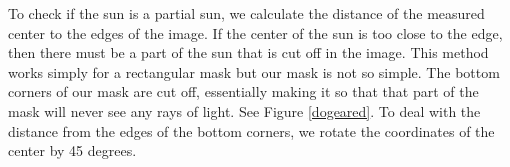 \documentclass[10pt]{scrartcl}
\begin{document}
To check if the sun is a partial sun, we calculate the distance of the measured center to the edges of the image. If the center of the sun is too close to the edge, then there must be a part of the sun that is cut off in the image. This method works simply for a rectangular mask but our mask is not so simple. The bottom corners of our mask are cut off, essentially making it so that that part of the mask will never see any rays of light. See Figure \ref{dogeared}. To deal with the distance from the edges of the bottom corners, we rotate the coordinates of the center by 45 degrees. 

\begin{figure}[!ht]
\end{figure}
\end{document}
